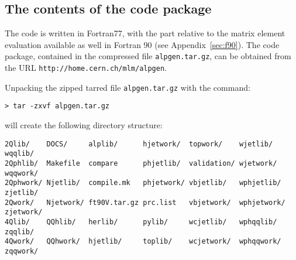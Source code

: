 \documentclass[paper]{JHEP3}
\begin{document}
\begin{appendix}
\section{The contents of the code package}
The code is written in Fortran77, with the part relative to the matrix
  element evaluation available as well in Fortran 90 (see
  Appendix~\ref{sec:f90}).
The code package, contained in the compressed file {\tt alpgen.tar.gz}, 
can be obtained from the URL
{\tt  http://home.cern.ch/mlm/alpgen}.

Unpacking the zipped tarred file {\tt alpgen.tar.gz} with the command:

\begin{verbatim}
> tar -zxvf alpgen.tar.gz
\end{verbatim}

will create the following directory structure:

\begin{verbatim}
2Qlib/    DOCS/     alplib/      hjetwork/  topwork/    wjetlib/    wqqlib/
2Qphlib/  Makefile  compare      phjetlib/  validation/ wjetwork/   wqqwork/
2Qphwork/ Njetlib/  compile.mk   phjetwork/ vbjetlib/   wphjetlib/  zjetlib/
2Qwork/   Njetwork/ ft90V.tar.gz prc.list   vbjetwork/  wphjetwork/ zjetwork/
4Qlib/    QQhlib/   herlib/      pylib/     wcjetlib/   wphqqlib/   zqqlib/
4Qwork/   QQhwork/  hjetlib/     toplib/    wcjetwork/  wphqqwork/  zqqwork/
\end{verbatim}                                                  




\end{appendix}
\end{document}
